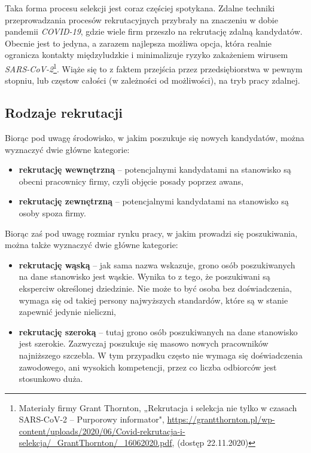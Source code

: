 \documentclass[twoside]{projektInzynierskiMS}
\numberwithin{figure}{section}
\begin{document}
Taka forma procesu selekcji jest coraz częściej spotykana. Zdalne techniki przeprowadzania procesów rekrutacyjnych przybrały na znaczeniu w dobie pandemii \textit{COVID-19}, gdzie wiele firm przeszło na rekrutację zdalną kandydatów. Obecnie jest to jedyna, a zarazem najlepsza możliwa opcja, która realnie ogranicza kontakty międzyludzkie i minimalizuje ryzyko zakażeniem wirusem \textit{SARS-CoV-2}\footnote{Materiały firmy Grant Thornton, „Rekrutacja i selekcja nie tylko w czasach SARS-CoV-2 -- Purporowy informator", \newline \url{https://grantthornton.pl/wp-content/uploads/2020/06/Covid-rekrutacja-i-selekcja/\_GrantThornton/\_16062020.pdf}, (dostęp 22.11.2020)}.
Wiąże się to z faktem przejścia przez przedsiębiorstwa w pewnym stopniu, lub często\linebreak w całości (w zależności od możliwości), na tryb pracy zdalnej.

\subsection{Rodzaje rekrutacji}
Biorąc pod uwagę środowisko, w jakim poszukuje się nowych kandydatów, można wyznaczyć dwie główne kategorie:
\begin{itemize}
\item \textbf{rekrutację wewnętrzną} – potencjalnymi kandydatami na stanowisko są obecni pracownicy firmy, czyli objęcie posady poprzez awans,
\item \textbf{rekrutację zewnętrzną} – potencjalnymi kandydatami na stanowisko są osoby spoza firmy.
\end{itemize}

Biorąc zaś pod uwagę rozmiar rynku pracy, w jakim prowadzi się poszukiwania, można także wyznaczyć dwie główne kategorie:
\begin{itemize}
\item \textbf{rekrutację wąską} – jak sama nazwa wskazuje, grono osób poszukiwanych na dane stanowisko jest wąskie. Wynika to z tego, że poszukiwani są eksperci\linebreak w określonej dziedzinie. Nie może to być osoba bez doświadczenia, wymaga się od takiej persony najwyższych standardów, które są w stanie zapewnić jedynie nieliczni,
\item \textbf{rekrutację szeroką} – tutaj grono osób poszukiwanych na dane stanowisko jest szerokie. Zazwyczaj poszukuje się masowo nowych pracowników najniższego szczebla. W tym przypadku często nie wymaga się doświadczenia zawodowego, ani wysokich kompetencji, przez co liczba odbiorców jest stosunkowo duża.
\end{itemize}
\end{document}
